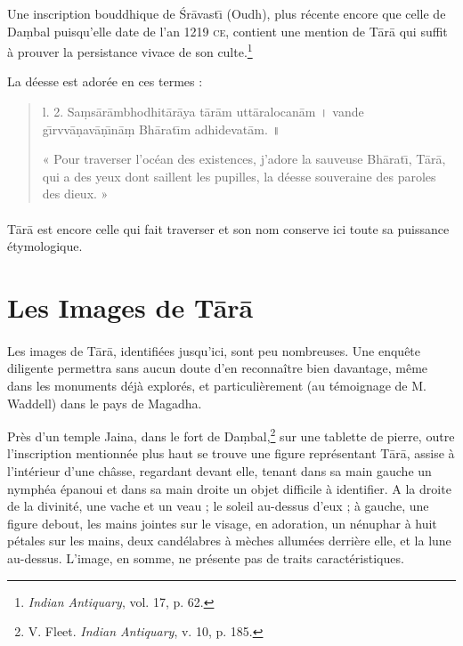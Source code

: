 \documentclass[a4paper, 11pt, oneside, french, landscape, twocolumn]{article}
\begin{document}
Une inscription bouddhique de \'{S}r\={a}vast\={\i} (Oudh), plus récente encore que celle de Da\d{m}bal puisqu'elle date de l'an 1219 \textsc{ce}, contient une mention de T\={a}r\={a} qui suffit à prouver la persistance vivace de son culte.\footnote{\emph{Indian Antiquary}, vol. 17, p. 62.}

La déesse est adorée en ces termes :
\begin{quotation}\footnotesize
l. 2. Sa\d{m}s\={a}r\={a}mbhodhit\={a}r\={a}ya t\={a}r\={a}m utt\={a}ralocan\={a}m \texthindi{।} vande g\={\i}rvv\={a}\d{n}av\={a}\d{n}\={\i}n\={a}\d{m} Bh\={a}rat\={\i}m adhidevat\={a}m. \texthindi{॥}

\bigskip

« Pour traverser l'océan des existences, j'adore la sauveuse Bh\={a}rat\={\i}, T\={a}r\={a}, qui a des yeux dont saillent les pupilles, la déesse souveraine des paroles des dieux. »
\end{quotation}
\paragraph{}
T\={a}r\={a} est encore celle qui fait traverser et son nom conserve ici toute sa puissance étymologique.
\clearpage
\section{Les Images de T\={a}r\={a}}
\paragraph{}
Les images de T\={a}r\={a}, identifiées jusqu'ici, sont peu nombreuses. Une enquête diligente permettra sans aucun doute d'en reconnaître bien davantage, même dans les monuments déjà explorés, et particulièrement (au témoignage de M. Waddell) dans le pays de Magadha.

Près d'un temple Jaina, dans le fort de Da\d{m}bal,\footnote{V. Fleet. \emph{Indian Antiquary}, v. 10, p. 185.} sur une tablette de pierre, outre l'inscription mentionnée plus haut se trouve une figure représentant T\={a}r\={a}, assise à l'intérieur d'une châsse, regardant devant elle, tenant dans sa main gauche un nymphéa épanoui et dans sa main droite un objet difficile à identifier. A la droite de la divinité, une vache et un veau ; le soleil au-dessus d'eux ; à gauche, une figure debout, les mains jointes sur le visage, en adoration, un nénuphar à huit pétales sur les mains, deux candélabres à mèches allumées derrière elle, et la lune au-dessus. L'image, en somme, ne présente pas de traits caractéristiques.
\end{document}
